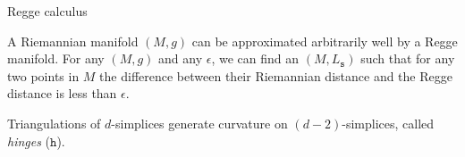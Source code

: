 \documentclass{beamer}
\newcommand\italictext[1]{\textcolor{italics}{\textit{#1}}}
\begin{document}
\begin{frame}{Regge calculus}
    \begin{list}{\maltese}{\leftmargin=1em \itemindent=0em}
        \item<1-> A Riemannian manifold $(M,g)$ can be approximated arbitrarily well by a Regge manifold. For any $(M,g)$ and any $\epsilon$, we can find an $(M,L_\mathtt{s})$ such that for any two points in $M$ the difference between their Riemannian distance and the Regge distance is less than $\epsilon$.
        \item<2-> Triangulations of $d$-simplices generate curvature on $(d-2)$-simplices, called \italictext{hinges} ($\mathtt{h}$).
        \item<3-> \noindent
        \begin{minipage}{\linewidth}
            \begin{columns}

\end{columns}
\end{minipage}
\end{list}
\end{frame}
\end{document}
